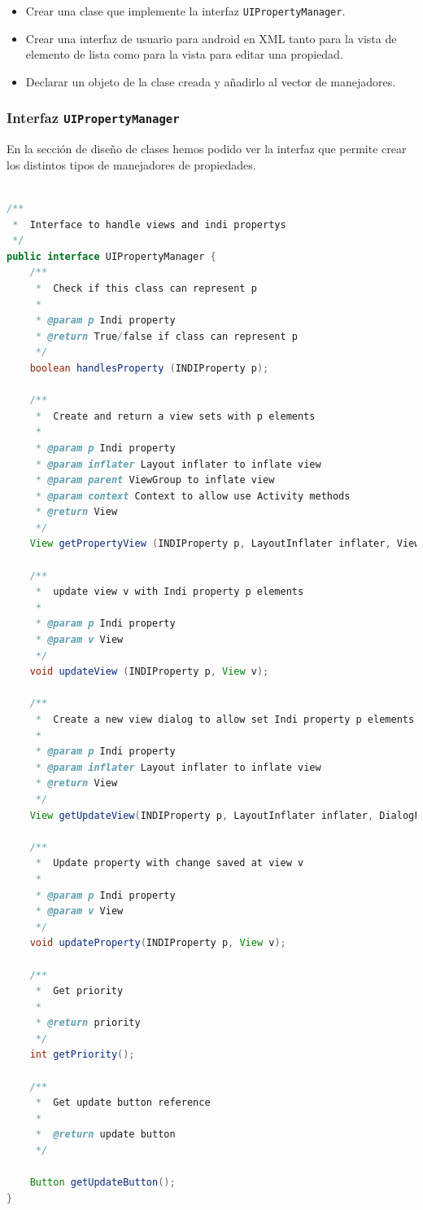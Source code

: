 \begin{itemize}
  \item Crear una clase que implemente la interfaz \texttt{UIPropertyManager}.
  \item Crear una interfaz de usuario para android en XML tanto para la vista de elemento de lista como para la vista para editar una propiedad.
  \item Declarar un objeto de la clase creada y añadirlo al vector de manejadores.
\end{itemize}


\subsubsection{Interfaz \texttt{UIPropertyManager}}

En la sección de diseño de clases hemos podido ver la interfaz que permite crear los distintos tipos de manejadores de propiedades.

\begin{lstlisting}[language=Java,caption={Interfaz UIPropertyManager},label={lst:ui_prop_manager}]

/**
 *  Interface to handle views and indi propertys
 */
public interface UIPropertyManager {
    /**
     *  Check if this class can represent p
     *
     * @param p Indi property
     * @return True/false if class can represent p
     */
    boolean handlesProperty (INDIProperty p);

    /**
     *  Create and return a view sets with p elements
     *
     * @param p Indi property
     * @param inflater Layout inflater to inflate view
     * @param parent ViewGroup to inflate view
     * @param context Context to allow use Activity methods
     * @return View
     */
    View getPropertyView (INDIProperty p, LayoutInflater inflater, ViewGroup parent, Context context);

    /**
     *  update view v with Indi property p elements
     *
     * @param p Indi property
     * @param v View
     */
    void updateView (INDIProperty p, View v);

    /**
     *  Create a new view dialog to allow set Indi property p elements
     *
     * @param p Indi property
     * @param inflater Layout inflater to inflate view
     * @return View
     */
    View getUpdateView(INDIProperty p, LayoutInflater inflater, DialogFragment fragment);

    /**
     *  Update property with change saved at view v
     *
     * @param p Indi property
     * @param v View
     */
    void updateProperty(INDIProperty p, View v);

    /**
     *  Get priority
     *
     * @return priority
     */
    int getPriority();

    /**
     *  Get update button reference
     *
     *  @return update button
     */

    Button getUpdateButton();
}

\end{lstlisting}

